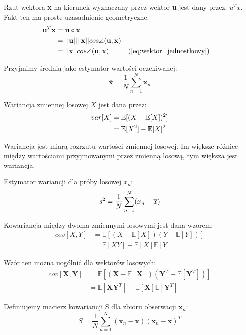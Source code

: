 \documentclass[oneside, eng]{mgr}
\newcommand{\bb}{\textbf}
\begin{document}
Rzut wektora \bb{x} na kierunek wyznaczany przez wektor \bb{u} jest dany przez: $u^{T}x$. Fakt ten ma proste uzasadnienie geometryczne:
\begin{align*}	
	\bb{u}^{T} \bb{x} &= \bb{u} \circ \bb{x} \\
		   & = ||\bb{u}|| ||\bb{x}|| cos \angle (\bb{u}, \bb{x}) \index{1} \\
		   &= ||\bb{x}|| cos \angle (\bb{u}, \bb{x}) \index{1} && \text{(\ref{eq:wektor_jednostkowy})}
\end{align*}

Przyjmimy średnią jako estymator wartości oczekiwanej:
\begin{equation}	\overline{\bb{x}} = \frac{1}{N} \sum_{n=1}^{N} \bb{x}_n \end{equation}

Wariancja zmiennej losowej $X$ jest dana przez:
\begin{align*}	\notag
	var[X]  &= \mathbb{E}[(X - \mathbb{E}[X])^2] \\
			&= \mathbb{E}[X^2] - \mathbb{E}[X]^2
\end{align*}

Wariancja jest miarą rozrzutu wartości zmiennej losowej. Im większe różnice między wartościami przyjmowanymi przez zmienną losową, tym większa jest wariancja.

Estymator wariancji dla próby losowej $x_n$:
\begin{equation}	\notag
	s^2 = \frac{1}{N} \sum_{n=1}^{N}(x_n - \overline{x})
\end{equation}

Kowariancja między dwoma zmiennymi losowymi jest dana wzorem:
\begin{align}	
	cov[X,Y] &= \mathbb{E}[(X - \mathbb{E}[X])(Y - \mathbb{E}[Y])]  \label{eq:cov} \\ 
			 &= \mathbb{E}[XY] - \mathbb{E}[X]\mathbb{E}[Y] \nonumber
\end{align}

Wzór ten można uogólnić dla wektorów losowych:
\begin{align*}
	cov[\textbf{X}, \bb{Y}] &= \mathbb{E}[(\bb{X} - \mathbb{E}[\bb{X}])(\bb{Y}^T - \mathbb{E}[\bb{Y}^T])] \\
							&= \mathbb{E}[\bb{X}\bb{Y}^T] - \mathbb{E}[\bb{X}]\mathbb{E}[\bb{Y}^T]
\end{align*}

Definiujemy macierz kowariancji S dla zbioru obserwacji $\bb{x}_n$:
\begin{equation}
	S = \frac{1}{N} \sum_{n=1}^{N} (\bb{x}_n - \overline{\bb{x}})(\bb{x}_n - \overline{\bb{x}})^T
\end{equation}
\end{document}
